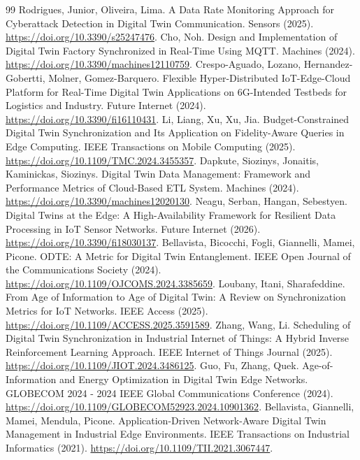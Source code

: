 \documentclass[11pt,a4paper]{article}
\begin{document}
\begin{thebibliography}{99}
 Rodrigues, Junior, Oliveira, Lima. A Data Rate Monitoring Approach for Cyberattack Detection in Digital Twin Communication. Sensors (2025). \url{https://doi.org/10.3390/s25247476}.
 Cho, Noh. Design and Implementation of Digital Twin Factory Synchronized in Real-Time Using MQTT. Machines (2024). \url{https://doi.org/10.3390/machines12110759}.
 Crespo-Aguado, Lozano, Hernandez-Gobertti, Molner, Gomez-Barquero. Flexible Hyper-Distributed IoT-Edge-Cloud Platform for Real-Time Digital Twin Applications on 6G-Intended Testbeds for Logistics and Industry. Future Internet (2024). \url{https://doi.org/10.3390/fi16110431}.
 Li, Liang, Xu, Xu, Jia. Budget-Constrained Digital Twin Synchronization and Its Application on Fidelity-Aware Queries in Edge Computing. IEEE Transactions on Mobile Computing (2025). \url{https://doi.org/10.1109/TMC.2024.3455357}.
 Dapkute, Siozinys, Jonaitis, Kaminickas, Siozinys. Digital Twin Data Management: Framework and Performance Metrics of Cloud-Based ETL System. Machines (2024). \url{https://doi.org/10.3390/machines12020130}.
 Neagu, Serban, Hangan, Sebestyen. Digital Twins at the Edge: A High-Availability Framework for Resilient Data Processing in IoT Sensor Networks. Future Internet (2026). \url{https://doi.org/10.3390/fi18030137}.
 Bellavista, Bicocchi, Fogli, Giannelli, Mamei, Picone. ODTE: A Metric for Digital Twin Entanglement. IEEE Open Journal of the Communications Society (2024). \url{https://doi.org/10.1109/OJCOMS.2024.3385659}.
 Loubany, Itani, Sharafeddine. From Age of Information to Age of Digital Twin: A Review on Synchronization Metrics for IoT Networks. IEEE Access (2025). \url{https://doi.org/10.1109/ACCESS.2025.3591589}.
 Zhang, Wang, Li. Scheduling of Digital Twin Synchronization in Industrial Internet of Things: A Hybrid Inverse Reinforcement Learning Approach. IEEE Internet of Things Journal (2025). \url{https://doi.org/10.1109/JIOT.2024.3486125}.
 Guo, Fu, Zhang, Quek. Age-of-Information and Energy Optimization in Digital Twin Edge Networks. GLOBECOM 2024 - 2024 IEEE Global Communications Conference (2024). \url{https://doi.org/10.1109/GLOBECOM52923.2024.10901362}.
 Bellavista, Giannelli, Mamei, Mendula, Picone. Application-Driven Network-Aware Digital Twin Management in Industrial Edge Environments. IEEE Transactions on Industrial Informatics (2021). \url{https://doi.org/10.1109/TII.2021.3067447}.

\end{thebibliography}
\end{document}
